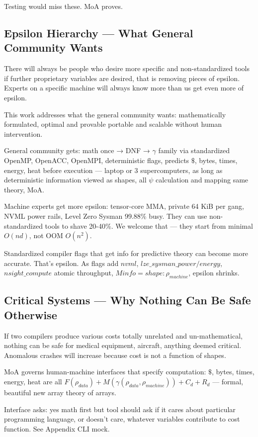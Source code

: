 \documentclass[11pt]{article}
\begin{document}
Testing would miss these. MoA proves.

\subsection{Epsilon Hierarchy — What General Community Wants}

There will always be people who desire more specific and non-standardized tools if further proprietary variables are desired, that is removing pieces of epsilon. Experts on a specific machine will always know more than us get even more of epsilon. 

This work addresses what the general community wants: mathematically formulated, optimal and provable portable and scalable without human intervention.

General community gets: math once → DNF → $\gamma$ family via standardized OpenMP, OpenACC, OpenMPI, deterministic flags, predicts $\$$, bytes, times, energy, heat before execution — laptop or 3 supercomputers, as long as deterministic information viewed as shapes, all $\psi$ calculation and mapping same theory, MoA.

Machine experts get more epsilon: tensor-core MMA, private 64 KiB per gang, NVML power rails, Level Zero Sysman 99.88\% busy. They can use non-standardized tools to shave 20-40\%. We welcome that — they start from minimal $O(nd)$, not OOM $O(n^2)$.

Standardized compiler flags that get info for predictive theory can become more accurate. That's epsilon. As flags add $nvml$, $lze\_sysman\_power/energy$, $nsight\_compute$ atomic throughput, $Minfo=shape:\rho_{machine}$, epsilon shrinks.

\subsection{Critical Systems — Why Nothing Can Be Safe Otherwise}

If two compilers produce various costs totally unrelated and un-mathematical, nothing can be safe for medical equipment, aircraft, anything deemed critical. Anomalous crashes will increase because cost is not a function of shapes.

MoA governs human-machine interfaces that specify computation: $\$$, bytes, times, energy, heat are all $F(\rho_{data})+M(\gamma(\rho_{data},\rho_{machine}))+C_d+R_d$ — formal, beautiful new array theory of arrays.

Interface asks: yes math first but tool should ask if it cares about particular programming language, or doesn't care, whatever variables contribute to cost function. See Appendix CLI mock.
\end{document}
